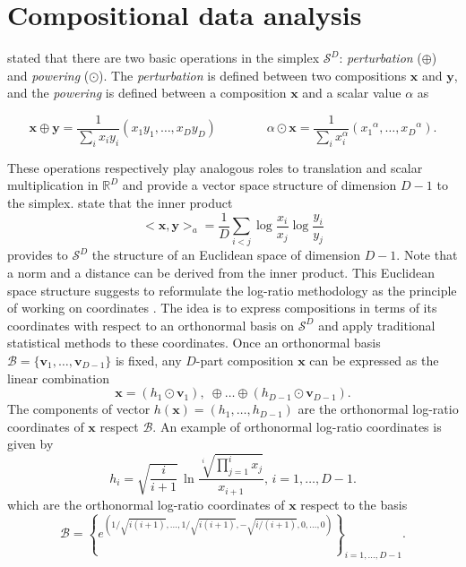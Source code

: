 \documentclass[preprint, review, 3p, authoryear]{elsarticle}
\begin{document}




\section{Compositional data analysis}
\label{coda_section}


 \noindent \cite{aitchison1986statistical} stated that  there are two basic operations in the simplex $\mathcal{S}^D$: \emph{perturbation} ($\oplus$) and 
 \emph{powering} ($\odot$). The \emph{perturbation} is defined between two compositions $\textbf{x}$ 
and $\textbf{y}$,  and the \emph{powering} is defined between a composition $\textbf{x}$ and a scalar value $\alpha$ as

\begin{equation}
\textbf{x} \oplus \textbf{y} =  \frac{1}{\sum_i x_i y_i}( x_1 y_1, \dots, x_D y_D) \qquad\qquad \alpha
 \odot \textbf{x} =  \frac{1}{\sum_i x_i^\alpha}( {x_1}^\alpha, \dots, {x_D}^\alpha).
\label{pert_pow}
\end{equation}

These operations respectively play analogous roles to translation and scalar multiplication in $\mathbb{R}^D$ and provide a vector space
structure of dimension $D-1$ to the simplex. \cite{PE01} state that the inner product 
\begin{equation}
<\textbf{x}, \textbf{y}>_a = \frac{1}{D} \sum_{i < j} \log \frac{x_i}{x_j} \log \frac{y_i}{y_j}
\label{inner_prod}
\end{equation}
 provides to $\mathcal{S}^D$ the structure of an Euclidean space of dimension $D-1$. Note that a norm and a distance can be derived from the inner product.
This Euclidean space structure suggests to reformulate the log-ratio methodology as the principle of working on coordinates \citep{MPE2011}. The idea is to express compositions in terms of its coordinates with respect to an orthonormal basis on $\mathcal{S}^D$ and apply
traditional statistical methods to these coordinates. Once an orthonormal basis $\mathcal{B} = \{\textbf{v}_1, \dots, \textbf{v}_{D-1}\}$ is fixed, any $D$-part composition $\textbf{x}$ can be expressed as the linear combination
\[
\textbf{x} = (h_1 \odot \textbf{v}_1),\; \oplus \dots  \oplus (h_{D-1} \odot \textbf{v}_{D-1}).
\]
The components of vector $h(\textbf{x})=(h_1, \dots, h_{D-1})$ are the orthonormal log-ratio coordinates of $\textbf{x}$ respect $\mathcal{B}$. An example of orthonormal log-ratio coordinates  \citep{egozcue2003isometric} is given by
\begin{equation}
\label{eilr}
h_i=\sqrt{\frac{i}{i+1}}\,\ln\frac{\sqrt[i]
{\prod_{j=1}^{i} x_j}}{x_{i+1}},\,i=1,\dots,D-1.
\end{equation}
which are the orthonormal log-ratio coordinates of $\textbf{x}$ respect to the basis
\[
\mathcal{B} = \left\{ e^{\left( 1/\sqrt{i(i+1)}, \dots, 1/\sqrt{i(i+1)}, -\sqrt{ i/(i+1)}, 0, \dots, 0\right)} \right\}_{i=1,\dots,D-1}.
\]
\end{document}
